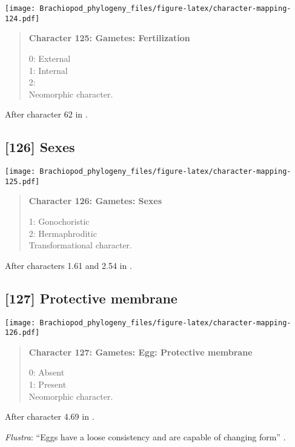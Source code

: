 \documentclass[openany]{book}
\theoremstyle{definition}
\theoremstyle{definition}
\theoremstyle{definition}
\theoremstyle{remark}
\begin{document}
\texttt{[image: Brachiopod\_phylogeny\_files/figure-latex/character-mapping-124.pdf]}

\begin{quote}
\textbf{Character 125: Gametes: Fertilization}

0: External\\
1: Internal\\
2:\\
Neomorphic character.
\end{quote}

After character 62 in \citet{Haszprunar2000}.

\subsection*{{[}126{]} Sexes}\label{sexes}

\texttt{[image: Brachiopod\_phylogeny\_files/figure-latex/character-mapping-125.pdf]}

\begin{quote}
\textbf{Character 126: Gametes: Sexes}

1: Gonochoristic\\
2: Hermaphroditic\\
Transformational character.
\end{quote}

After characters 1.61 and 2.54 in \citet{SPS1996}.

\subsection*{{[}127{]} Protective membrane}\label{protective-membrane}

\texttt{[image: Brachiopod\_phylogeny\_files/figure-latex/character-mapping-126.pdf]}

\begin{quote}
\textbf{Character 127: Gametes: Egg: Protective membrane}

0: Absent\\
1: Present\\
Neomorphic character.
\end{quote}

After character 4.69 in \citet{SPS1996}.

\hypertarget{Flustra-coding-127}{}
\emph{Flustra}: ``Eggs have a loose consistency and are capable of
changing form'' \citep{Franzen2013}.
\end{document}
